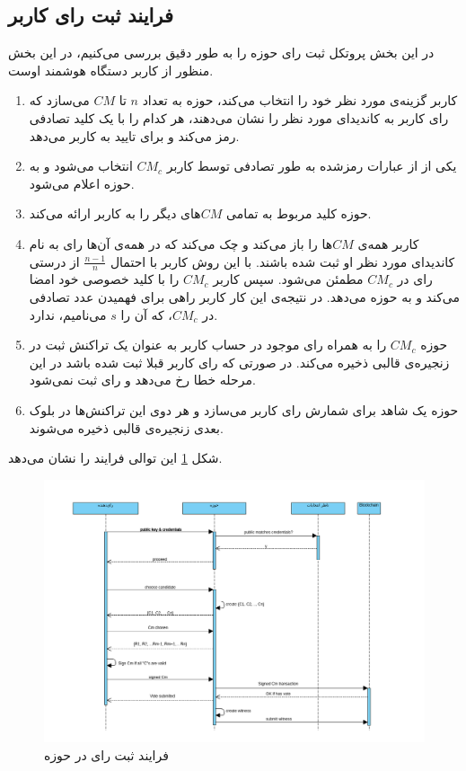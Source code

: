 \subsection{فرایند ثبت رای کاربر}
در این بخش پروتکل ثبت رای حوزه را به طور دقیق بررسی می‌کنیم، در این بخش منظور از کاربر دستگاه هوشمند اوست. 

\begin{enumerate}
	\item 
	کاربر گزینه‌ی مورد نظر خود را انتخاب می‌کند، حوزه به تعداد $n$ تا $CM$ می‌سازد که رای کاربر به کاندیدای مورد نظر را نشان می‌دهند، هر کدام را با یک کلید تصادفی رمز می‌کند و برای تایید به کاربر می‌دهد. 
	\item 
	یکی از از عبارات رمزشده به طور تصادفی توسط کاربر $CM_c$ انتخاب می‌شود و به حوزه اعلام می‌شود.
	\item 
	حوزه کلید مربوط به تمامی $CM$های دیگر را به کاربر ارائه می‌کند.
	\item 
	کاربر همه‌ی $CM$ها را باز می‌کند و چک می‌کند که در همه‌ی آن‌ها رای به نام کاندیدای مورد نظر او ثبت شده باشند. با این روش کاربر با احتمال $\frac{n-1}{n}$ از درستی رای در $CM_c$ مطمئن می‌شود. سپس کاربر $CM_c$ را با کلید خصوصی خود امضا می‌کند و به حوزه می‌دهد. در نتیجه‌ی این کار کاربر راهی برای فهمیدن عدد تصادفی در $CM_c$، که آن را $s$ می‌نامیم، ندارد.
	\item
	حوزه $CM_c$ را به همراه رای موجود در حساب کاربر به عنوان یک تراکنش ثبت در زنجیره‌ی قالبی ذخیره می‌کند. در صورتی که رای کاربر قبلا ثبت شده باشد در این مرحله خطا رخ می‌دهد و رای ثبت نمی‌شود. 
	\item
	حوزه یک شاهد برای شمارش رای کاربر می‌سازد و هر دوی این تراکنش‌ها در بلوک بعدی زنجیره‌ی قالبی ذخیره می‌شوند.
\end{enumerate}
شکل \ref{fig:seqdiag.png} این توالی فرایند را نشان می‌دهد.
\begin{figure}[t!]
	\centering
	\includegraphics[width=1\linewidth]{seqdiag.png}
	\caption {فرایند ثبت رای در حوزه}
	\label{fig:seqdiag.png}
\end{figure}

